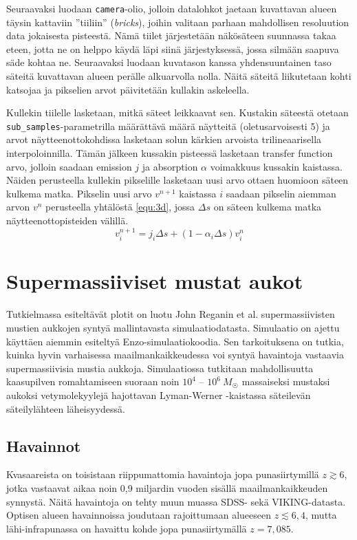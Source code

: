 \documentclass[12pt,a4paper]{article}
\begin{document}
Seuraavaksi luodaan \texttt{camera}-olio, jolloin datalohkot jaetaan kuvattavan alueen täysin kattaviin ''tiiliin'' (\textit{bricks}), joihin valitaan parhaan mahdollisen resoluution data jokaisesta pisteestä. Nämä tiilet järjestetään näkösäteen suunnassa takaa eteen, jotta ne on helppo käydä läpi siinä järjestyksessä, jossa silmään saapuva säde kohtaa ne. Seuraavaksi luodaan kuvatason kanssa yhdensuuntainen taso säteitä kuvattavan alueen perälle alkuarvolla nolla. Näitä säteitä liikutetaan kohti katsojaa ja pikselien arvot päivitetään kullakin askeleella. \cite{volume}

\begin{sloppypar}
Kullekin tiilelle lasketaan, mitkä säteet leikkaavat sen. Kustakin säteestä otetaan \texttt{sub\_samples}-parametrilla määrättävä määrä näytteitä (oletusarvoisesti 5) ja arvot näytteenottokohdissa lasketaan solun kärkien arvoista trilineaarisella interpoloinnilla. Tämän jälkeen kussakin pisteessä lasketaan transfer function arvo, jolloin saadaan emission $j$ ja absorption $\alpha$ voimakkuus kussakin kaistassa. Näiden perusteella kullekin pikselille lasketaan uusi arvo ottaen huomioon säteen kulkema matka. Pikselin uusi arvo $v^{n+1}$ kaistassa $i$ saadaan pikselin aiemman arvon $v^n$ perusteella yhtälöstä \ref{equ:3d}, jossa $\Delta s$ on säteen kulkema matka näytteenottopisteiden välillä.
\begin{equation}\label{equ:3d}
v^{n+1}_{i} =  j_{i}\Delta s + (1 - \alpha_{i}\Delta s )v^{n}_{i}
\end{equation}
\end{sloppypar}


\section{Supermassiiviset mustat aukot}
Tutkielmassa esiteltävät plotit on luotu John Reganin et al. supermassiivisten mustien aukkojen syntyä mallintavasta simulaatiodatasta. Simulaatio on ajettu käyttäen aiemmin esiteltyä Enzo-simulaatiokoodia. Sen tarkoituksena on tutkia, kuinka hyvin varhaisessa maailmankaikkeudessa voi syntyä havaintoja vastaavia supermassiivisia mustia aukkoja. Simulaatiossa tutkitaan mahdollisuutta kaasupilven romahtamiseen suoraan noin $10^4$ -- $10^6~ M_{\astrosun}$ massaiseksi mustaksi aukoksi vetymolekyylejä hajottavan Lyman-Werner -kaistassa säteilevän säteilylähteen läheisyydessä. \cite{rj}

\subsection{Havainnot}
Kvasaareista on toisistaan riippumattomia havaintoja jopa punasiirtymillä $z \gtrsim 6$, jotka vastaavat aikaa noin 0,9 miljardin vuoden sisällä maailmankaikkeuden synnystä. Näitä havaintoja on tehty muun muassa SDSS- sekä VIKING-datasta. Optisen alueen havainnoissa joudutaan rajoittumaan alueeseen $z \lesssim 6,4$, mutta lähi-infrapunassa on havaittu kohde jopa punasiirtymällä $z= 7,085$. \cite{fan, mortlock, venemans}
\end{document}
